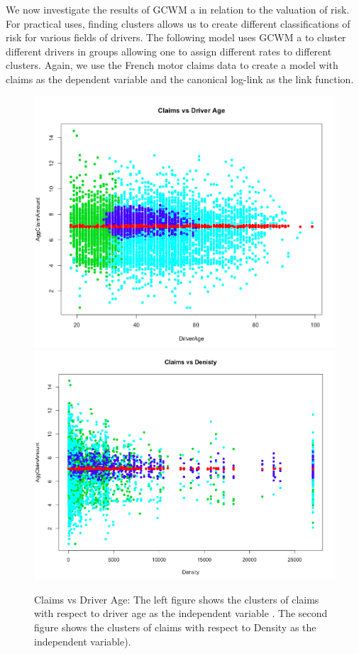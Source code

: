 \documentclass[11pt,letterpaper]{article}
\numberwithin{equation}{section}
\numberwithin{equation}{section}
\numberwithin{equation}{section}
\begin{document}
	We now investigate the results of GCWM a in relation to the valuation of risk. For practical uses, finding clusters allows us to create different classifications of risk for various fields of drivers. The following model uses GCWM a to cluster different drivers in groups allowing one to assign different rates to different clusters. Again, we use the French motor claims data to create a model with claims as the dependent variable and the canonical log-link as the link function. 
\begin{figure}[!htb]
\begin{center}
\includegraphics[scale=0.24]{clms.png}
\includegraphics[scale=0.24]{dens.png}
\end{center}
\caption{Claims vs Driver Age: The left figure shows the clusters of claims with respect to driver age as the independent variable . The second figure shows the clusters of claims with respect to Density as the independent variable).}
\label{fig:vet1}
\end{figure}
\end{document}
